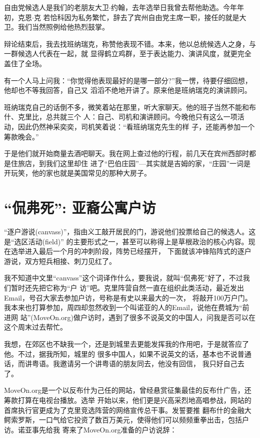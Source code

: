 ﻿\documentclass[11pt]{article}
\begin{document}
自由党候选人是我们的老朋友大卫$\cdot$约翰，去年选举日我曾去帮他助选。今年年初，克恩$\cdot$克
若恰科因为私务繁忙，辞去了宾州自由党主席一职，接任的就是大卫。我们当然照例给他热烈鼓掌。

辩论结束后，我去找班纳瑞克，称赞他表现不错。本来，他以总统候选人之身，与一群候选人代表在一起，就
显得鹤立鸡群，至于表达能力、演讲风度，就更完全盖住了全场。

有一个人马上问我：``你觉得他表现最好的是哪一部分?''我一愣，待要仔细回想，他却也不等我回答，自己又
滔滔不绝地开讲了。原来他是班纳瑞克的演讲顾问。

班纳瑞克自己的话倒不多，微笑着站在那里，听大家聊天。他的班子当然不能和布什、克里比，总共就三个
人：自己、司机和演讲顾问。今晚他只有这么一项活动，因此仍然神采奕奕，司机笑着说：``看班纳瑞克先生的样
子，还能再参加一个筹款晚会。''

于是他们就开始商量去酒吧聊天。我在网上查过他的行程，前几天在宾州西部时都是住旅店，到我们这里却住
进了``巴伯庄园''---其实就是吉姆的家，``庄园''一词是开玩笑，他的家也就是美国常见的那种大房子。

\section{``侃弗死'': 亚裔公寓户访}

``逐户游说(canvass)''，指由义工敲开居民的门，游说他们投票给自己的候选人。这是``选区活动(field)''
的主要形式之一，甚至可以称得上是草根政治的核心内容。现在选举进入最后一个月的冲刺阶段，阵势已经摆开，
下面就该冲锋陷阵式的逐户游说，双方短兵相接、刺刀见红了。

我不知道中文里``canvass''这个词译作什么，要我说，就叫``侃弗死''好了，不过我们暂时还先把它称为``户
访''吧。克里阵营自然一直在组织此类活动，最近发出Email，号召大家去参加户访，号称是有史以来最大的一次，
将敲开100万户门。我本来也打算参加，周四却忽然收到一个叫诺亚的人的Email，说他在费城为``前进网
站''(MoveOn.org)做户访时，遇到了很多不说英文的中国人，问我是否可以在这个周末过去帮忙。

我想，在郊区也不缺我一个，还是到城里去更能发挥我的作用吧，于是就答应了他。不过，据我所知，城里的
很多中国人，如果不说英文的话，基本也不说普通话，而讲粤语。我邀请另一个讲粤语的朋友同去，他没有回信，
我只好自己去了。

MoveOn.org是一个以反布什为己任的网站，曾经悬赏征集最佳的反布什广告，还筹款打算在电视台播放。选举
开始以来，他们更是兴高采烈地高唱参战，网站的首席执行官更成为了克里竞选阵营的网络宣传总干事。发誓要推
翻布什的金融大鳄索罗斯，一口气给它投资了数百万美元，使得他们可以频频重拳出击，包括户访。诺亚事先给我
寄来了MoveOn.org准备的户访说辞：
\end{document}
